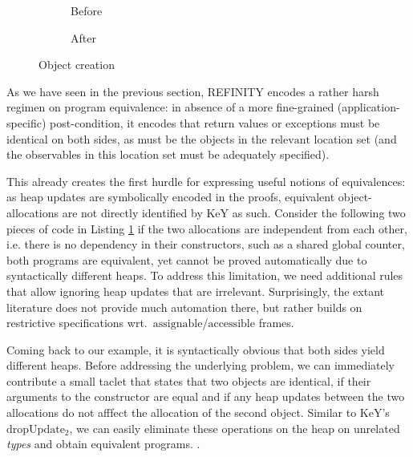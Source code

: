 \newcommand\relevant{$\mathrm{relevant}$}
\newcommand\assignable{$\mathrm{assignable}$}
\newcommand\accessible{$\mathrm{accessible}$}
\newcommand\keyrule[1]{\ensuremath{\mathrm{#1}}}

\begin{figure}
  \centering
  \begin{subfigure}{.3\linewidth}
    
    \caption{Before}
  \end{subfigure}\hspace{1cm}
  \begin{subfigure}{.3\linewidth}
    
    \caption{After}
  \end{subfigure}
\caption{Object creation}
\label{lst:ObjectCreation-refinity}
\end{figure}

As we have seen in the previous section, REFINITY encodes a rather harsh regimen on program equivalence:
in absence of a more fine-grained (application-specific) post-condition, it encodes that return values or exceptions must be identical on both sides,
as must be the objects in the \relevant{} location set (and the observables in this location set must be adequately specified).

This already creates the first hurdle for expressing useful notions of equivalences: as heap updates are symbolically encoded in the proofs, equivalent object-allocations are not directly identified by KeY as such.
Consider the following two pieces of code in Listing \ref{lst:ObjectCreation-refinity}
if the two allocations are independent from each other, i.e. there is no dependency in their constructors, such as a shared global counter,
both programs are equivalent, yet cannot be proved automatically due to syntactically different heaps.
To address this limitation, we need additional rules that allow ignoring heap updates that are irrelevant.
Surprisingly, the extant literature does not provide much automation there, but rather builds on restrictive specifications wrt.\ \assignable{}/\accessible{} frames.

Coming back to our example, it is syntactically obvious that both sides yield different heaps.
Before addressing the underlying problem, 
we can immediately contribute a small taclet that states that two objects are identical, if their arguments to the constructor are equal and if any heap updates between the two allocations do not afffect the allocation of the second object.
Similar to KeY's \keyrule{dropUpdate_2}, we can easily eliminate these operations on the heap on unrelated \textit{types} and obtain equivalent programs.
.

